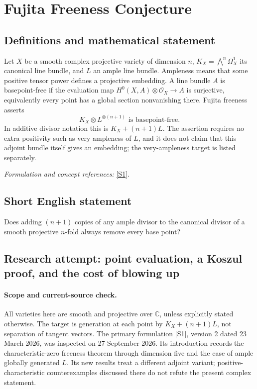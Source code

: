 \documentclass[11pt]{article}
\begin{document}
\section*{\texorpdfstring{Fujita Freeness Conjecture}{Fujita Freeness Conjecture}}\label{statement}
\subsection{Definitions and mathematical statement}
Let $X$ be a smooth complex projective variety of dimension $n$, $K_X=\bigwedge^n\Omega_X^1$ its canonical line bundle, and $L$ an ample line bundle. Ampleness means that some positive tensor power defines a projective embedding. A line bundle $A$ is basepoint-free if the evaluation map $H^0(X,A)\otimes\mathcal O_X\to A$ is surjective, equivalently every point has a global section nonvanishing there. Fujita freeness asserts
\[
 K_X\otimes L^{\otimes(n+1)}\text{ is basepoint-free}.
\]
In additive divisor notation this is $K_X+(n+1)L$. The assertion requires no extra positivity such as very ampleness of $L$, and it does not claim that this adjoint bundle itself gives an embedding; the very-ampleness target is listed separately.
\par\smallskip\textit{Formulation and concept references:} \href{https://arxiv.org/abs/2408.06530v2}{[S1]}.

\subsection{Short English statement}
Does adding $(n+1)$ copies of any ample divisor to the canonical divisor of a smooth projective $n$-fold always remove every base point?
\subsection{Research attempt: point evaluation, a Koszul proof, and the cost of blowing up}
\paragraph{Scope and current-source check.}
All varieties here are smooth and projective over $\mathbb C$, unless explicitly stated otherwise. The target is generation at each point by $K_X+(n+1)L$, not separation of tangent vectors. The primary formulation [S1], version 2 dated 23 March 2026, was inspected on 27 September 2026. Its introduction records the characteristic-zero freeness theorem through dimension five and the case of ample globally generated $L$. Its new results treat a different adjoint variant; positive-characteristic counterexamples discussed there do not refute the present complex statement.
\end{document}
